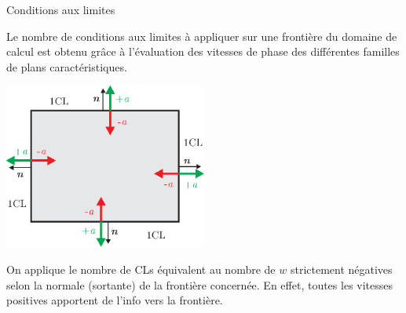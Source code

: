 \documentclass[
mode=present,    %
paper=a4paper,   %
orient=landscape,
display=slides,   %
size=10pt,
style=romain   %
]{powerdot}
\begin{document}
\begin{slide}[toc=C.L.]{Conditions aux limites}

Le nombre de conditions aux limites à appliquer sur une frontière du domaine de calcul est obtenu grâce à l'évaluation des vitesses de phase des différentes familles de plans caractéristiques.

    \centerline{\includegraphics[width=0.5\textwidth]{bc2d.eps} }

On applique le nombre de CLs équivalent au nombre de $w$ strictement négatives selon la
normale (sortante) de la frontière concernée. En effet, toutes les vitesses positives apportent de l’info vers la frontière.


\end{slide}
\end{document}
